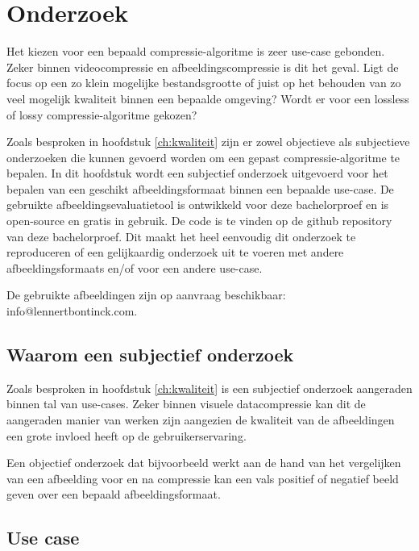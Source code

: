 \chapter{Onderzoek}
\label{ch:onderzoek}

Het kiezen voor een bepaald \gls{compressie-algoritme} is zeer \gls{use-case} gebonden. Zeker binnen \gls{videocompressie} en \gls{afbeeldingscompressie} is dit het geval. Ligt de focus op een zo klein mogelijke bestandsgrootte of juist op het behouden van zo veel mogelijk kwaliteit binnen een bepaalde omgeving? Wordt er voor een \gls{lossless} of \gls{lossy} \gls{compressie-algoritme} gekozen?

Zoals besproken in hoofdstuk \ref{ch:kwaliteit} zijn er zowel objectieve als subjectieve onderzoeken die kunnen gevoerd worden om een gepast \gls{compressie-algoritme} te bepalen. In dit hoofdstuk wordt een subjectief onderzoek uitgevoerd voor het bepalen van een geschikt \gls{afbeeldingsformaat} binnen een bepaalde \gls{use-case}. De gebruikte \gls{afbeeldingsevaluatietool} is ontwikkeld voor deze bachelorproef en is \gls{open-source} en gratis in gebruik. De code is te vinden op de \gls{github} repository van deze bachelorproef. Dit maakt het heel eenvoudig dit onderzoek te reproduceren of een gelijkaardig onderzoek uit te voeren met andere \glspl{afbeeldingsformaat} en/of voor een andere \gls{use-case}.

De gebruikte afbeeldingen zijn op aanvraag beschikbaar: info@lennertbontinck.com.

\section{Waarom een subjectief onderzoek}
\label{sec:onderzoek-waarom-subjectief}

Zoals besproken in hoofdstuk \ref{ch:kwaliteit} is een subjectief onderzoek aangeraden binnen tal van \glspl{use-case}. Zeker binnen visuele \gls{datacompressie} kan dit de aangeraden manier van werken zijn aangezien de kwaliteit van de afbeeldingen een grote invloed heeft op de gebruikerservaring. 

Een objectief onderzoek dat bijvoorbeeld werkt aan de hand van het vergelijken van een afbeelding voor en na compressie kan een vals positief of negatief beeld geven over een bepaald \gls{afbeeldingsformaat}.

\section{Use case}
\label{sec:onderzoek-use-case}


